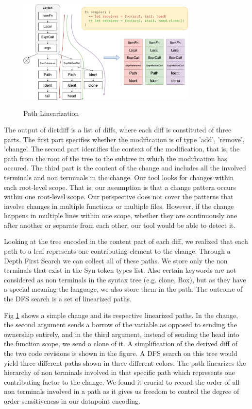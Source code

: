 \begin{figure}[h]
\centering
\includegraphics[width=0.8\textwidth]{linearization.png}
\label{f2}
\caption{Path Linearization}
\end{figure}

The output of dictdiff is a list of diffs, where each diff is constituted of three parts. The first part specifies whether the modification is of type 'add', 'remove', 'change'. The second part identifies the context of the modification, that is, the path from the root of the tree to the subtree in which the modification has occured. The third part is the content of the change and includes all the involved terminals and non terminals in the change. Our tool looks for changes within each root-level scope. That is, our assumption is that a change pattern occurs within one root-level scope. Our perspective does not cover the patterns that involve changes in multiple functions or multiple files. However, if the change happens in multiple lines within one scope, whether they are continuously one after another or separate from each other, our tool would be able to detect it.

Looking at the tree encoded in the content part of each diff, we realized that each path to a leaf represents one contributing element to the change. Through a Depth First Search we can collect all of these paths. We store only the non terminals that exist in the Syn token types list. Also certain keywords are not considered as non terminals in the syntax tree (e.g. clone, Box), but as they have a special meaning the language, we also store them in the path. The outcome of the DFS search is a set of linearized paths.

Fig \ref{f2} shows a simple change and its respective linearized paths. In the change, the second argument sends a borrow of the variable as opposed to sending the ownership entirely, and in the third argument, instead of sending the head into the function scope, we send a clone of it. A simplification of the derived diff of the two code revisions is shown in the figure. A DFS search on this tree would yield three different paths shown in three different colors. The path linearizes the hierarchy of non terminals involved in that specific path which represents one contributing factor to the change. We found it crucial to record the order of all non terminals involved in a path as it gives us freedom to control the degree of order-sensitiveness in our datapoint encoding.

